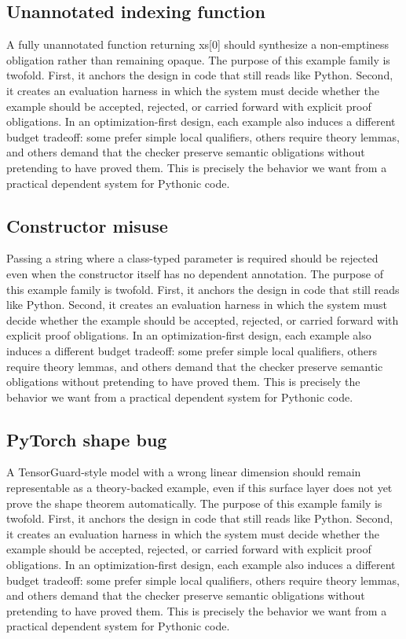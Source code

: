 \documentclass[11pt]{article}
\theoremstyle{definition}
\theoremstyle{plain}
\begin{document}
\subsection{Unannotated indexing function}
A fully unannotated function returning xs[0] should synthesize a non-emptiness obligation rather than remaining opaque.
The purpose of this example family is twofold. First, it anchors the design in
code that still reads like Python. Second, it creates an evaluation harness in
which the system must decide whether the example should be accepted, rejected,
or carried forward with explicit proof obligations. In an optimization-first
design, each example also induces a different budget tradeoff: some prefer
simple local qualifiers, others require theory lemmas, and others demand that
the checker preserve semantic obligations without pretending to have proved
them. This is precisely the behavior we want from a practical dependent system
for Pythonic code.

\subsection{Constructor misuse}
Passing a string where a class-typed parameter is required should be rejected even when the constructor itself has no dependent annotation.
The purpose of this example family is twofold. First, it anchors the design in
code that still reads like Python. Second, it creates an evaluation harness in
which the system must decide whether the example should be accepted, rejected,
or carried forward with explicit proof obligations. In an optimization-first
design, each example also induces a different budget tradeoff: some prefer
simple local qualifiers, others require theory lemmas, and others demand that
the checker preserve semantic obligations without pretending to have proved
them. This is precisely the behavior we want from a practical dependent system
for Pythonic code.

\subsection{PyTorch shape bug}
A TensorGuard-style model with a wrong linear dimension should remain representable as a theory-backed example, even if this surface layer does not yet prove the shape theorem automatically.
The purpose of this example family is twofold. First, it anchors the design in
code that still reads like Python. Second, it creates an evaluation harness in
which the system must decide whether the example should be accepted, rejected,
or carried forward with explicit proof obligations. In an optimization-first
design, each example also induces a different budget tradeoff: some prefer
simple local qualifiers, others require theory lemmas, and others demand that
the checker preserve semantic obligations without pretending to have proved
them. This is precisely the behavior we want from a practical dependent system
for Pythonic code.
\end{document}
